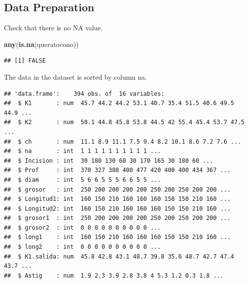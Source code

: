 \documentclass[]{article}
\newenvironment{Shaded}{\begin{snugshade}}{\end{snugshade}}
\newcommand{\KeywordTok}[1]{\textcolor[rgb]{0.13,0.29,0.53}{\textbf{#1}}}
\newcommand{\NormalTok}[1]{#1}
\newcommand{\OperatorTok}[1]{\textcolor[rgb]{0.81,0.36,0.00}{\textbf{#1}}}
\newcommand{\StringTok}[1]{\textcolor[rgb]{0.31,0.60,0.02}{#1}}
\begin{document}
\hypertarget{data-preparation}{%
\subsection{Data Preparation}\label{data-preparation}}

Check that there is no NA value.

\begin{Shaded}
\begin{Highlighting}[]
\KeywordTok{any}\NormalTok{(}\KeywordTok{is.na}\NormalTok{(queratocono))}
\end{Highlighting}
\end{Shaded}

\begin{verbatim}
## [1] FALSE
\end{verbatim}

The data in the dataset is sorted by column na.

\begin{Shaded}
\end{Shaded}

\begin{verbatim}
## 'data.frame':    394 obs. of  16 variables:
##  $ K1       : num  45.7 44.2 44.2 53.1 40.7 35.4 51.5 40.6 49.5 44.9 ...
##  $ K2       : num  50.1 44.8 45.8 53.8 44.5 42 55.4 45.4 53.7 47.5 ...
##  $ ch       : num  11.1 8.9 11.1 7.5 9.4 8.2 10.1 8.6 7.2 7.6 ...
##  $ na       : int  1 1 1 1 1 1 1 1 1 1 ...
##  $ Incision : int  30 180 130 60 30 170 165 30 180 60 ...
##  $ Prof     : int  370 327 380 400 477 420 400 400 434 367 ...
##  $ diam     : int  5 6 6 5 5 5 6 6 5 5 ...
##  $ grosor   : int  250 200 200 200 200 250 200 250 200 200 ...
##  $ Longitud1: int  160 150 210 160 160 160 150 150 210 160 ...
##  $ Longitud2: int  160 150 210 160 160 160 150 150 210 160 ...
##  $ grosor1  : int  250 200 200 200 200 250 200 250 200 200 ...
##  $ grosor2  : int  0 0 0 0 0 0 0 0 0 0 ...
##  $ long1    : int  160 150 210 160 160 160 150 150 210 160 ...
##  $ long2    : int  0 0 0 0 0 0 0 0 0 0 ...
##  $ K1.salida: num  45.8 42.8 43.1 48.7 39.8 35.6 48.7 42.7 47.4 43.7 ...
##  $ Astig    : num  1.9 2.3 3.9 2.8 3.8 4 5.3 1.2 0.3 1.8 ...
\end{verbatim}
\end{document}
